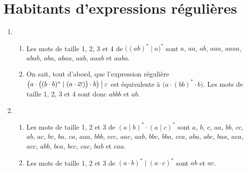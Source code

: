 \section{Habitants d'expressions régulières}

\begin{enumerate}
	\item \begin{enumerate}[label=\textit{(\arabic*)}]
			\item Les mots de taille 1, 2, 3 et 4 de $\big((ab)^*  \mid a\big)^*$\/ sont $a$, $aa$, $ab$, $aaa$, $aaaa$, $abab$, $aba$, $abaa$, $aab$, $aaab$ et $aaba$.
			\item On sait, tout d'abord, que l'expression régulière $\big(a\cdot \big((b\cdot b)^*  \mid (a\cdot \varnothing)\big) \cdot b\big)\:\big|\: \varepsilon$\/ est équivalente à $\big(a \cdot (bb)^* \cdot b \big)$. Les mots de taille 1, 2, 3 et 4 sont donc $abbb$\/ et $ab$.
		\end{enumerate}
	\item \begin{enumerate}[label=\textit{(\arabic*)}]
			\item Les mots de taille 1, 2 et 3 de $(a \mid b)^* \cdot (a \mid c)^*$\/ sont $a$, $b$, $c$, $aa$, $bb$, $cc$, $ab$, $ac$, $bc$, $ba$, $ca$, $aaa$, $bbb$, $ccc$, $aac$, $aab$, $bbc$, $bba$, $cca$, $aba$, $abc$, $baa$, $aca$, $acc$, $abb$, $bca$, $bcc$, $cac$, $bab$\/ et $caa$.
			\item Les mots de taille 1, 2 et 3 de $(a\cdot b)^*  \mid (a\cdot c)^*$\/ sont $ab$\/ et $ac$.
		\end{enumerate}
\end{enumerate}
